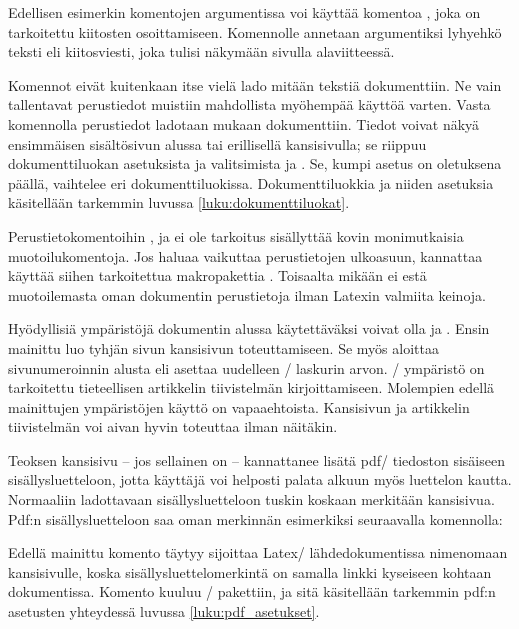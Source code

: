 Edellisen esimerkin komentojen argumentissa voi käyttää komentoa
, joka on tarkoitettu kiitosten osoittamiseen.
Komennolle annetaan argumentiksi lyhyehkö teksti eli kiitosviesti, joka
tulisi näkymään sivulla alaviitteessä.

Komennot eivät kuitenkaan itse vielä lado mitään tekstiä dokumenttiin.
Ne vain tallentavat perustiedot muistiin mahdollista myöhempää käyttöä
varten. Vasta komennolla  perustiedot ladotaan
mukaan dokumenttiin. Tiedot voivat näkyä ensimmäisen sisältösivun alussa
tai erillisellä kansisivulla; se riippuu dokumenttiluokan asetuksista ja
valitsimista  ja . Se, kumpi asetus
on oletuksena päällä, vaihtelee eri dokumenttiluokissa.
Dokumenttiluokkia ja niiden asetuksia käsitellään tarkemmin luvussa
\ref{luku:dokumenttiluokat}.

Perustietokomentoihin ,  ja
 ei ole tarkoitus sisällyttää kovin monimutkaisia
muotoilukomentoja. Jos haluaa vaikuttaa perustietojen ulkoasuun,
kannattaa käyttää siihen tarkoitettua makropakettia
. Toisaalta mikään ei estä
muotoilemasta oman dokumentin perustietoja ilman Latexin valmiita
keinoja.

Hyödyllisiä ympäristöjä dokumentin alussa käytettäväksi voivat olla
 ja . Ensin mainittu luo
tyhjän sivun kansisivun toteuttamiseen. Se myös aloittaa sivunumeroinnin
alusta eli asettaa uudelleen \-/ laskurin arvon.
\-/ ympäristö on tarkoitettu tieteellisen artikkelin
tiivistelmän kirjoittamiseen. Molempien edellä mainittujen ympäristöjen
käyttö on vapaaehtoista. Kansisivun ja artikkelin tiivistelmän voi aivan
hyvin toteuttaa ilman näitäkin.

Teoksen kansisivu -- jos sellainen on -- kannattanee lisätä pdf\-/
tiedoston sisäiseen sisällysluetteloon, jotta käyttäjä voi helposti
palata alkuun myös luettelon kautta. Normaaliin ladottavaan
sisällysluetteloon tuskin koskaan merkitään kansisivua. Pdf:n
sisällysluetteloon saa oman merkinnän esimerkiksi seuraavalla
komennolla:

\begin{koodilohkosis}
\end{koodilohkosis}

Edellä mainittu komento  täytyy sijoittaa Latex\-/
lähdedokumentissa nimenomaan kansisivulle, koska
sisällysluettelomerkintä on samalla linkki kyseiseen kohtaan
dokumentissa. Komento kuuluu \-/ pakettiin, ja sitä
käsitellään tarkemmin pdf:n asetusten yhteydessä luvussa
\ref{luku:pdf_asetukset}.

